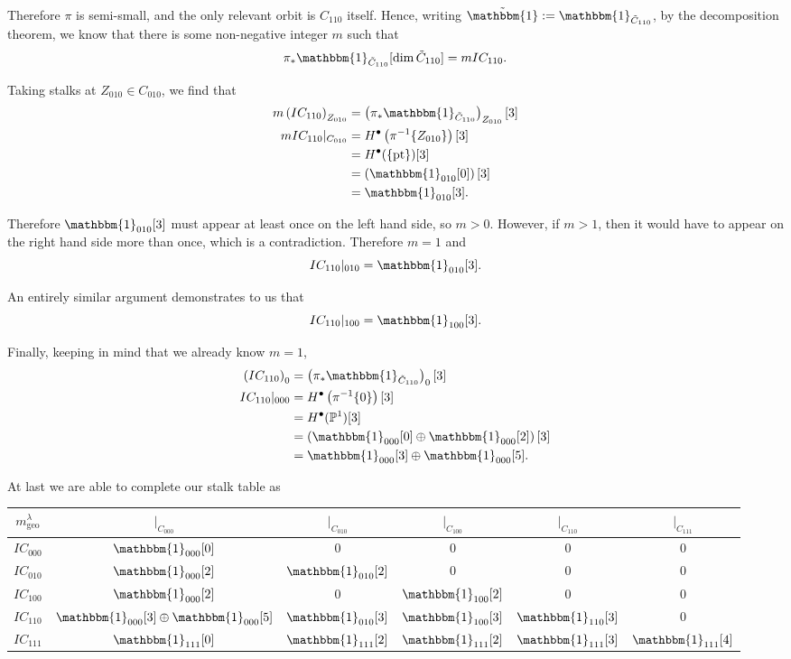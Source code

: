 \documentclass{memoir}
\newcommand{\mb}{\mathbb}
\newcommand{\lb}{\left(}
\newcommand{\rb}{\right)}
\newcommand{\tx}{\text}
\theoremstyle{definition}
\begin{document}
	Therefore $\pi$ is semi-small, and the only relevant orbit is $C_{110}$ itself.  
	Hence, writing $\tilde{\mathbbm{1}}:=\mathbbm{1}_{\tilde{C}_{110}}$, by the decomposition theorem, we know that there is some non-negative integer $m$ such that 
	$$\pi_\ast\mathbbm{1}_{\tilde{C}_{110}}[\dim\tilde{C}_{110}]=m IC_{110}.$$
	
	Taking stalks at $Z_{010}\in C_{010}$, we find that 
	\begin{align*}
		m\lb IC_{110}\rb_{Z_{010}}&=\lb\pi_\ast\mathbbm{1}_{\tilde{C}_{110}}\rb_{Z_{010}}[3]\\ 
		mIC_{110}|_{C_{010}}&=H^\bullet\lb\pi^{-1}\{Z_{010}\}\rb[3]\\
		&=H^\bullet(\{\tx{pt}\})[3]\\
		&=\lb\mathbbm{1}_{010}[0]\rb[3]\\
		&=\mathbbm{1}_{010}[3].
	\end{align*}
	
	Therefore $\mathbbm{1}_{010}[3]$ must appear at least once on the left hand side, so $m>0$.  
	However, if $m>1$, then it would have to appear on the right hand side more than once, which is a contradiction.  
	Therefore $m=1$ and 
	$$IC_{110}|_{010}=\mathbbm{1}_{010}[3].$$
	
	An entirely similar argument demonstrates to us that 
	$$IC_{110}|_{100}=\mathbbm{1}_{100}[3].$$
	
	Finally, keeping in mind that we already know $m=1$,
		\begin{align*}
		\lb IC_{110}\rb_0&=\lb\pi_\ast\mathbbm{1}_{\tilde{C}_{110}}\rb_0[3]\\ 
			IC_{110}|_{000}&=H^\bullet\lb\pi^{-1}\{0\}\rb[3]\\
			&=H^\bullet(\mb{P}^1)[3]\\
			&=\lb\mathbbm{1}_{000}[0]\oplus\mathbbm{1}_{000}[2]\rb[3]\\
			&=\mathbbm{1}_{000}[3]\oplus\mathbbm{1}_{000}[5].
		\end{align*}
	
	At last we are able to complete our stalk table as
	\begin{center}
		\begin{tabular}{ c | c c c c c}
			$m_{\tx{geo}}^\lambda$ & $|_{C_{000}}$ & $|_{C_{010}}$ & $|_{C_{100}}$ & $|_{C_{110}}$ & $|_{C_{111}}$ \\
			\hline 
			$IC_{000}$ & $\mathbbm{1}_{000}[0]$ & 0 & 0 & 0 & 0\\
			$IC_{010}$ & $\mathbbm{1}_{000}[2]$ & $\mathbbm{1}_{010}[2]$ & 0 & 0 & 0 \\
			$IC_{100}$ & $\mathbbm{1}_{000}[2]$ & 0 & $\mathbbm{1}_{100}[2]$ & 0 & 0 \\
			$IC_{110}$ & $\mathbbm{1}_{000}[3]\oplus\mathbbm{1}_{000}[5]$ & $\mathbbm{1}_{010}[3]$ & $\mathbbm{1}_{100}[3]$ & $\mathbbm{1}_{110}[3]$ & 0 \\
			$IC_{111}$ & $\mathbbm{1}_{111}[0]$ & $\mathbbm{1}_{111}[2]$ & $\mathbbm{1}_{111}[2]$ & $\mathbbm{1}_{111}[3]$ & $\mathbbm{1}_{111}[4]$ \\
		\end{tabular}
	\end{center}
	
\end{document}
